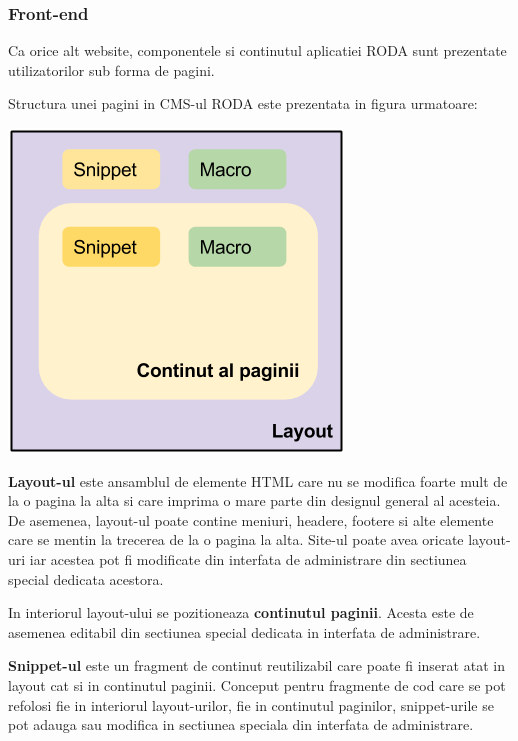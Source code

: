 \documentclass[a4paper, 10pt]{article}
\begin{document}
{\bigskip

\subsubsection*{Front-end}

Ca orice alt website, componentele si continutul aplicatiei RODA sunt prezentate utilizatorilor sub forma de pagini. 



\bigskip

Structura unei pagini in CMS-ul RODA este prezentata in figura urmatoare:
\begin{center}
\includegraphics[scale=0.6]{roda-page.png}
\end{center}



\textbf{Layout-ul} este ansamblul de elemente HTML care nu se modifica foarte mult de la o pagina la alta si care imprima o mare parte din designul general al acesteia. 
De asemenea, layout-ul poate contine meniuri, headere, footere si alte elemente care se mentin la trecerea de la o pagina la alta. 
Site-ul poate avea oricate layout-uri iar acestea pot fi modificate din interfata de administrare din sectiunea special dedicata acestora.



\bigskip

In interiorul layout-ului se pozitioneaza \textbf{continutul paginii}. Acesta este de asemenea editabil din sectiunea special dedicata in interfata de administrare. 



\bigskip

\textbf{Snippet-ul} este un fragment de continut reutilizabil care poate fi inserat atat in layout cat si in continutul paginii. 
Conceput pentru fragmente de cod care se pot refolosi fie in interiorul layout-urilor, fie in continutul paginilor, snippet-urile se pot adauga sau modifica in sectiunea speciala din interfata de administrare. 



}
\end{document}
